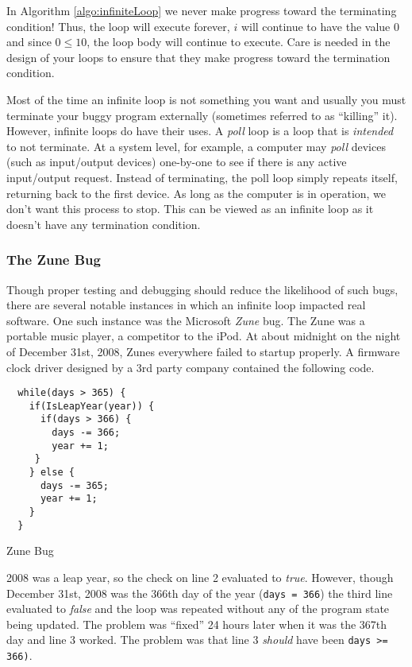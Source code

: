 In Algorithm \ref{algo:infiniteLoop} we never make progress toward the terminating
condition!  Thus, the loop will execute forever, $i$ will continue to have the value 0
and since $0 \leq 10$, the loop body will continue to execute.  Care is needed in the
design of your loops to ensure that they make progress toward the termination condition.

Most of the time an infinite loop is not something you want and usually you must 
terminate your buggy program externally (sometimes referred to as ``killing'' it).  
However, infinite loops do have their uses.  A \emph{poll} loop is a loop that is
\emph{intended} to not terminate.  At a system level, for example, a computer
may \emph{poll} devices (such as input/output devices) one-by-one to see if
there is any active input/output request.  Instead of terminating, the poll loop
simply repeats itself, returning back to the first device.  As long as the computer
is in operation, we don't want this process to stop.  This can be viewed as an 
infinite loop as it doesn't have any termination condition.

\subsubsection{The Zune Bug}
\label{subsubsection:zuneBug}

Though proper testing and debugging should reduce the likelihood of such bugs,
there are several notable instances in which an infinite loop impacted real 
software.  One such instance was the Microsoft \emph{Zune} bug.  The Zune
was a portable music player, a competitor to the iPod.  At about midnight on 
the night of December 31st, 2008, Zunes everywhere failed to startup properly.
A firmware clock driver designed by a 3rd party company contained the following
code. 

\begin{listing}[H]
\begin{verbatim}
  while(days > 365) {
    if(IsLeapYear(year)) {
      if(days > 366) {
        days -= 366;
        year += 1;
     }
    } else {
      days -= 365;
      year += 1;
    }
  }
\end{verbatim}
  \caption{Zune Bug}
  \label{code:c:zuneBug}
\end{listing}

2008 was a leap year, so the check on line 2 evaluated to \emph{true}.
However, though December 31st, 2008 was the 366th day of the year (\texttt{days = 366})
the third line evaluated to \emph{false} and the loop was repeated without any of
the program state being updated.  The problem was ``fixed'' 24 hours later when 
it was the 367th day and line 3 worked.  The problem was that line 3 \emph{should} have been
\texttt{days >= 366)}.  

